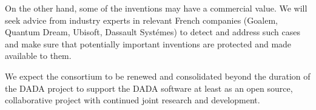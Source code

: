 On the other hand, some of the inventions may have a commercial value. We will seek advice from
industry experts in relevant  French companies (Goalem, Quantum Dream, Ubisoft, Dassault Syst\'emes) 
to detect and address such cases  and make sure that potentially important inventions are protected and made available to them.

We expect the consortium to be renewed and consolidated beyond the duration of the DADA project to support the DADA software 
at least as an open source, collaborative project with continued joint research and development. 
\endinput

